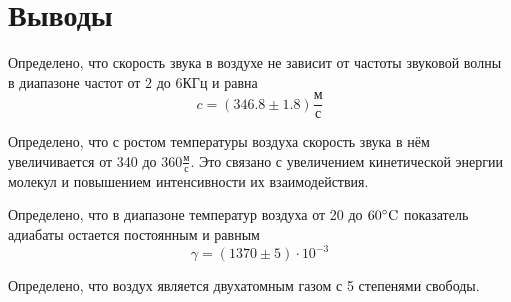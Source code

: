 \section{Выводы}

Определено, что скорость звука в воздухе не зависит от частоты звуковой волны в диапазоне частот от $2$ до $6\text{КГц}$ и равна
\[ c = (346.8 \pm 1.8) \frac{\text{м}}{\text{с}}\]

Определено, что с ростом температуры воздуха скорость звука в нём увеличивается от 340 до $360\frac{\text{м}}{\text{с}}$. Это связано с увеличением кинетической энергии молекул и повышением интенсивности их взаимодействия.

Определено, что в диапазоне температур воздуха от 20 до $60\celsius$ показатель адиабаты остается постоянным и равным
\[\gamma = (1370 \pm 5)\cdot 10^{-3}\]

Определено, что воздух является двухатомным газом с 5 степенями свободы.